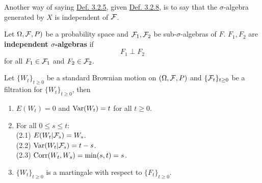 \documentclass[11pt,fleqn]{book} %
\begin{document}
\begin{remark} \label{rmk:3210}
Another way of saying \hyperref[def:325]{Def. 3.2.5}, given \hyperref[def:328]{Def. 3.2.8}, is to say that the \(\sigma\)-algebra generated by \(X\) is independent of \(\mathcal{F}\).
\end{remark}

\begin{definition} \label{def:3211}
Let \(\Omega, \mathcal{F}, P)\) be a probability space and \(\mathcal{F}_1, \mathcal{F}_2\) be sub-\(\sigma\)-algebras of \(F\). \(F_1, F_2\) are \textbf{independent \(\sigma\)-algebras} if
\[
F_1 \perp F_2
\]
for all \(F_1 \in \mathcal{F}_1\) and \(F_2 \in \mathcal{F}_2\).
\end{definition}

\begin{proposition} \label{prop:3212}
Let \(\{W_t\}_{t\geq0}\) be a standard Brownian motion on \((\Omega, \mathcal{F}, P)\) and \(\{\mathcal{F}_t\}_{t\geq0}\) be a filtration for \(\{W_t\}_{t\geq0}\), then
\begin{enumerate}
\item \(E(W_t) = 0\) and \(\operatorname{Var}(W_t) = t\) for all \(t \geq 0\).
\item For all \(0 \leq s \leq t\): \\
(2.1) \(E(W_t|\mathcal{F}_s) = W_s\). \\
(2.2) \(\operatorname{Var}(W_t|\mathcal{F}_s) = t - s\). \\
(2.3) \(\operatorname{Corr}(W_t, W_s) = \min(s, t) = s\).
\item \(\{W_t\}_{t\geq0}\) is a martingale with respect to \(\{F_t\}_{t\geq0}\).
\end{enumerate}
\end{proposition}
\end{document}
